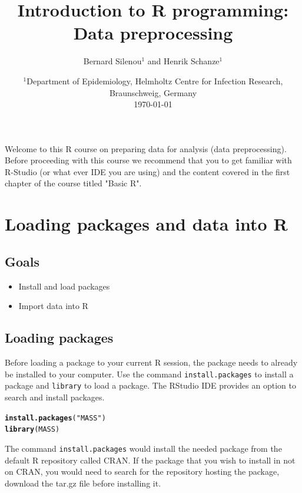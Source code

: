 \documentclass[a4paper]{article}\usepackage[]{graphicx}\usepackage[]{xcolor}
\title{Introduction to R programming: Data preprocessing}
\author{Bernard Silenou$^1$ and Henrik Schanze$^1$}
\date{%
    $^{1}$Department of Epidemiology, Helmholtz Centre for Infection Research, Braunschweig, Germany\\%
   \vspace{2em} 
    \today
}
\makeatletter
\newcommand{\hlstr}[1]{\textcolor[rgb]{0.192,0.494,0.8}{#1}}%
\newcommand{\hlstd}[1]{\textcolor[rgb]{0.345,0.345,0.345}{#1}}%
\newcommand{\hlkwd}[1]{\textcolor[rgb]{0.737,0.353,0.396}{\textbf{#1}}}%
\newenvironment{kframe}{%
 \def\at@end@of@kframe{}%
 \ifinner\ifhmode%
  \def\at@end@of@kframe{\end{minipage}}%
  \begin{minipage}{\columnwidth}%
 \fi\fi%
 \def\FrameCommand##1{\hskip\@totalleftmargin \hskip-\fboxsep
 \colorbox{shadecolor}{##1}\hskip-\fboxsep
     \hskip-\linewidth \hskip-\@totalleftmargin \hskip\columnwidth}%
 \MakeFramed {\advance\hsize-\width
   \@totalleftmargin\z@ \linewidth\hsize
   \@setminipage}}%
 {\par\unskip\endMakeFramed%
 \at@end@of@kframe}
\newenvironment{knitrout}{}{} %
\makeatother
\begin{document}
\maketitle
\vfill
\tableofcontents
\clearpage



\noindent Welcome to this R course on preparing data for analysis (data preprocessing). Before proceeding with this course we recommend that you to get familiar with R-Studio (or what ever IDE you are using) and the content covered in the first chapter of the course titled "Basic R".

\section{Loading packages and data into R}
\subsection*{Goals}
\begin{itemize}
\item Install and load packages
\item Import data into  R
\end{itemize} 

\subsection{Loading packages}
Before loading a package to  your current R session, the package needs to already be installed to your computer. Use the command \texttt{install.packages} to install a package and \texttt{library} to load a package. The RStudio IDE provides an option to search and install  packages. 

\begin{knitrout}
\color{fgcolor}\begin{kframe}
\begin{alltt}
\hlkwd{install.packages}\hlstd{(}\hlstr{"MASS"}\hlstd{)}
\hlkwd{library}\hlstd{(MASS)}
\end{alltt}
\end{kframe}
\end{knitrout}

\noindent The command \texttt{install.packages} would install the needed package from the default R repository called CRAN. If the package that you wish to install in not on CRAN, you would need to search for the repository hosting the package, download the tar.gz file before installing it.
\end{document}
